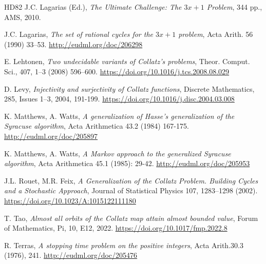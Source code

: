 \documentclass[12pt, twoside, leqno]{article}
\theoremstyle{definition}
\numberwithin{equation}{section}
\begin{document}
\begin{thebibliography}{HD82}
 J.C. Lagarias (Ed.), \textit{The Ultimate Challenge: The $3x+1$ Problem}, 344 pp., AMS, 2010.

 J.C. Lagarias, \textit{The set of rational cycles for the $3x + 1$ problem}, Acta Arith. 56 (1990) 33–53. \url{http://eudml.org/doc/206298}

 E. Lehtonen, \textit{Two undecidable variants of Collatz's problems}, Theor. Comput. Sci., 407, 1–3 (2008) 596–600. \url{https://doi.org/10.1016/j.tcs.2008.08.029}

 D. Levy, \textit{Injectivity and surjectivity of Collatz functions}, Discrete Mathematics, 285, Issues 1–3,
2004, 191-199. \url{https://doi.org/10.1016/j.disc.2004.03.008}

 K. Matthews, A. Watts, \textit{A generalization of Hasse's generalization of the Syracuse algorithm}, Acta Arithmetica 43.2 (1984) 167-175. \url{http://eudml.org/doc/205897}

 K. Matthews, A. Watts, \textit{A Markov approach to the generalized Syracuse algorithm}, Acta Arithmetica 45.1 (1985): 29-42. \url{http://eudml.org/doc/205953}

 J.L. Rouet, M.R. Feix, \textit{A Generalization of the Collatz Problem. Building Cycles and a Stochastic Approach}, Journal of Statistical Physics 107, 1283–1298 (2002). \url{https://doi.org/10.1023/A:1015122111180}

 T. Tao,  \textit{Almost all orbits of the Collatz map attain almost bounded value}, Forum of Mathematics, Pi, 10, E12, 2022. \url{https://doi.org/10.1017/fmp.2022.8}

 R. Terras, \textit{A stopping time problem on the positive integers}, Acta Arith.30.3 (1976), 241. \url{http://eudml.org/doc/205476}



\end{thebibliography}
\end{document}
